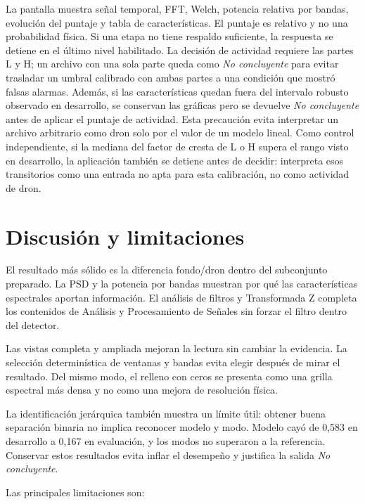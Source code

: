\documentclass[11pt,a4paper]{article}
\begin{document}
La pantalla muestra señal temporal, FFT, Welch, potencia relativa por bandas, evolución
del puntaje y tabla de características. El puntaje es relativo y no una probabilidad
física. Si una etapa no tiene respaldo suficiente, la respuesta se detiene en el último
nivel habilitado. La decisión de actividad requiere las partes L y H; un archivo con una
sola parte queda como \emph{No concluyente} para evitar trasladar un umbral calibrado con
ambas partes a una condición que mostró falsas alarmas.
Además, si las características quedan fuera del intervalo robusto observado en desarrollo,
se conservan las gráficas pero se devuelve \emph{No concluyente} antes de aplicar el
puntaje de actividad. Esta precaución evita interpretar un archivo arbitrario como dron
solo por el valor de un modelo lineal. Como control independiente, si la mediana del factor
de cresta de L o H supera el rango visto en desarrollo, la aplicación también se detiene
antes de decidir: interpreta esos transitorios como una entrada no apta para esta
calibración, no como actividad de dron.

\section{Discusión y limitaciones}

El resultado más sólido es la diferencia fondo/dron dentro del subconjunto preparado. La
PSD y la potencia por bandas muestran por qué las características espectrales aportan
información. El análisis de filtros y Transformada Z completa los contenidos de Análisis y
Procesamiento de Señales sin
forzar el filtro dentro del detector.

Las vistas completa y ampliada mejoran la lectura sin cambiar la evidencia. La selección
determinística de ventanas y bandas evita elegir después de mirar el resultado. Del mismo
modo, el relleno con ceros se presenta como una grilla espectral más densa y no como una mejora
de resolución física.

La identificación jerárquica también muestra un límite útil: obtener buena separación
binaria no implica reconocer modelo y modo. Modelo cayó de 0,583 en desarrollo a 0,167 en
evaluación, y los modos no superaron a la referencia. Conservar estos resultados evita inflar el
desempeño y justifica la salida \emph{No concluyente}.

Las principales limitaciones son:
\end{document}
